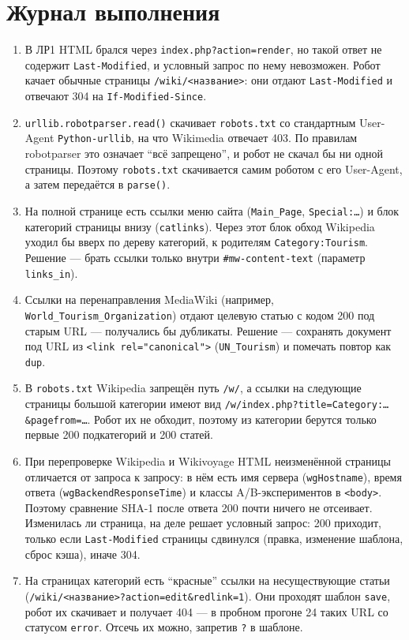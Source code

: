 \section{Журнал выполнения}
\begin{enumerate}
    \item В ЛР1 HTML брался через \texttt{index.php?action=render}, но такой ответ не содержит \texttt{Last-Modified}, и условный запрос по нему невозможен. Робот качает обычные страницы \texttt{/wiki/<название>}: они отдают \texttt{Last-Modified} и отвечают 304 на \texttt{If-Modified-Since}.
    \item \texttt{urllib.robotparser.read()} скачивает \texttt{robots.txt} со стандартным User-Agent \texttt{Python-urllib}, на что Wikimedia отвечает 403. По правилам robotparser это означает \enquote{всё запрещено}, и робот не скачал бы ни одной страницы. Поэтому \texttt{robots.txt} скачивается самим роботом с его User-Agent, а затем передаётся в \texttt{parse()}.
    \item На полной странице есть ссылки меню сайта (\texttt{Main\_Page}, \texttt{Special:\ldots}) и блок категорий страницы внизу (\texttt{catlinks}). Через этот блок обход Wikipedia уходил бы вверх по дереву категорий, к родителям \texttt{Category:Tourism}. Решение --- брать ссылки только внутри \texttt{\#mw-content-text} (параметр \texttt{links\_in}).
    \item Ссылки на перенаправления MediaWiki (например, \texttt{World\_Tourism\_Organization}) отдают целевую статью с кодом 200 под старым URL --- получались бы дубликаты. Решение --- сохранять документ под URL из \texttt{<link rel="canonical">} (\texttt{UN\_Tourism}) и помечать повтор как \texttt{dup}.
    \item В \texttt{robots.txt} Wikipedia запрещён путь \texttt{/w/}, а ссылки на следующие страницы большой категории имеют вид \texttt{/w/index.php?title=Category:\ldots\&pagefrom=\ldots}. Робот их не обходит, поэтому из категории берутся только первые 200 подкатегорий и 200 статей.
    \item При перепроверке Wikipedia и Wikivoyage HTML неизменённой страницы отличается от запроса к запросу: в нём есть имя сервера (\texttt{wgHostname}), время ответа (\texttt{wgBackendResponseTime}) и классы A/B-экспериментов в \texttt{<body>}. Поэтому сравнение SHA-1 после ответа 200 почти ничего не отсеивает. Изменилась ли страница, на деле решает условный запрос: 200 приходит, только если \texttt{Last-Modified} страницы сдвинулся (правка, изменение шаблона, сброс кэша), иначе 304.
    \item На страницах категорий есть \enquote{красные} ссылки на несуществующие статьи (\texttt{/wiki/<название>?action=edit\&redlink=1}). Они проходят шаблон \texttt{save}, робот их скачивает и получает 404 --- в пробном прогоне 24 таких URL со статусом \texttt{error}. Отсечь их можно, запретив \texttt{?} в шаблоне.

\end{enumerate}
